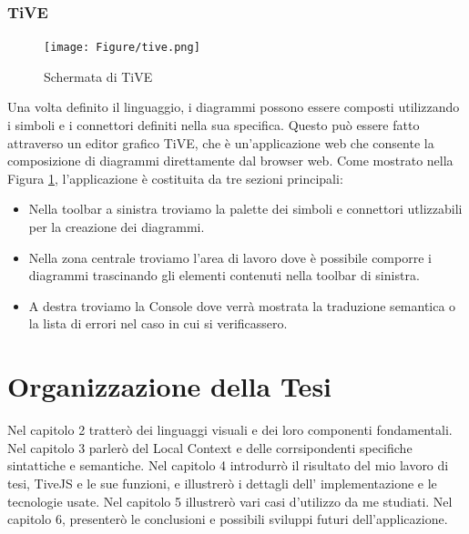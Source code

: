             \subsubsection{TiVE}

                \begin{figure}[htbp]
                    \centering
                    \texttt{[image: Figure/tive.png]}
                    \caption{Schermata di TiVE}
                    \label{fig:tive}
                \end{figure}

                Una volta definito il linguaggio, i diagrammi possono essere composti utilizzando i simboli e i connettori definiti nella sua specifica. Questo può essere fatto attraverso un editor grafico TiVE, che è un'applicazione web che consente la composizione di diagrammi direttamente dal browser web.
                \newline
                Come mostrato nella Figura \ref{fig:tive}, l'applicazione è costituita da tre sezioni principali:
                \begin{itemize}
                    \item Nella toolbar a sinistra troviamo la palette dei simboli e connettori utlizzabili per la creazione dei diagrammi.
                    \item Nella zona centrale troviamo l'area di lavoro dove è possibile comporre i diagrammi trascinando gli elementi contenuti nella toolbar di sinistra.
                    \item A destra troviamo la Console dove verrà mostrata la traduzione semantica o la lista di errori nel caso in cui si verificassero.
                \end{itemize}

    \section{Organizzazione della Tesi}
        Nel capitolo 2 tratterò dei linguaggi visuali e dei loro componenti fondamentali. Nel capitolo 3 parlerò del Local Context e delle corrsipondenti specifiche sintattiche e semantiche. Nel capitolo 4 introdurrò il risultato del mio lavoro di tesi, TiveJS e le sue funzioni, e illustrerò  i dettagli dell' implementazione e le tecnologie usate. Nel capitolo 5 illustrerò vari casi d'utilizzo da me studiati. Nel capitolo 6, presenterò le conclusioni e possibili sviluppi futuri dell'applicazione.